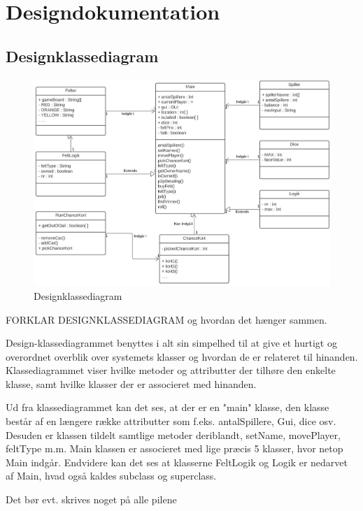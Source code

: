 \section{Designdokumentation}
\subsection{Designklassediagram}
\begin{figure}[H]
            \centering
            \includegraphics[width=14cm]{figures/designKlasseDiagram.JPG}
            \caption{Designklassediagram}
        \end{figure}

FORKLAR DESIGNKLASSEDIAGRAM og hvordan det hænger sammen.

Design-klassediagrammet benyttes i alt sin simpelhed til at give et  hurtigt og overordnet overblik over systemets klasser og hvordan de er relateret til hinanden.  Klassediagrammet viser hvilke metoder og attributter der tilhøre den enkelte klasse, samt hvilke klasser der er associeret med hinanden. 

Ud fra klassediagrammet kan det ses, at der er en "main" klasse, den klasse består af en længere række attributter som f.eks. antalSpillere, Gui, dice osv. Desuden er klassen tildelt samtlige metoder deriblandt, setName, movePlayer, feltType m.m. Main klassen er associeret med lige præcis 5 klasser, hvor netop Main indgår. Endvidere kan det ses at  klasserne FeltLogik og Logik er nedarvet af Main, hvad også kaldes subclass og superclass. 

Det bør evt. skrives noget på alle pilene
        

